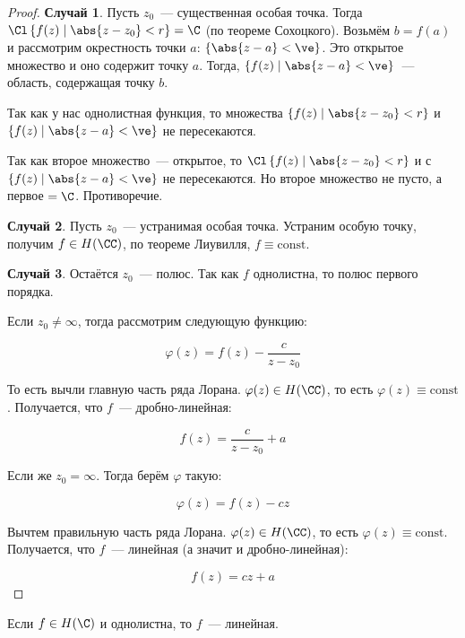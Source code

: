 \begin{proof}\text{}

    \textbf{Случай 1}. Пусть $z_0$~--- существенная особая точка.
    Тогда $\Cl\left\{ f(z) \mid \abs{z-z_0} < r \right\} = \C$
    (по теореме Сохоцкого). Возьмём $b = f(a)$ и рассмотрим окрестность
    точки $a$: $\left\{ \abs{z-a} < \ve \right\}$.
    Это открытое множество и оно содержит точку $a$.
    Тогда, $\left\{ f(z) \mid \abs{z-a} < \ve \right\}$~--- область,
    содержащая точку $b$.

    Так как у нас однолистная функция, то
    множества $\left\{ f(z) \mid \abs{z-z_0} < r \right\}$ и
    $\left\{ f(z) \mid \abs{z-a} < \ve \right\}$ не пересекаются.

    Так как второе множество~--- открытое,
    то $\Cl\left\{ f(z) \mid \abs{z-z_0} < r \right\}$ и
    с $\left\{ f(z) \mid \abs{z-a} < \ve \right\}$ не пересекаются.
    Но второе множество не пусто, а первое $ = \C$. Противоречие.

    \textbf{Случай 2}. Пусть $z_0$~--- устранимая особая точка.
    Устраним особую точку, получим $f \in H(\CC)$, по теореме Лиувилля,
    $f \equiv \mathrm{const}$.

    \textbf{Случай 3}. Остаётся $z_0$~--- полюс.
    Так как $f$ однолистна, то полюс первого порядка.

    Если $z_0 \ne \infty$, тогда рассмотрим следующую функцию:

    \[
        \varphi(z) = f(z) - \frac{c}{z-z_0}
    \]

    То есть вычли главную часть ряда Лорана.
    $\varphi(z) \in H(\CC)$, то есть $\varphi(z) \equiv \mathrm{const}$.
    Получается, что $f$~--- дробно-линейная:

    \[
        f(z) = \frac{c}{z-z_0} + a
    \]

    Если же $z_0 = \infty$.
    Тогда берём $\varphi$ такую:

    \[
        \varphi(z) = f(z) - cz
    \]

    Вычтем правильную часть ряда Лорана.
    $\varphi(z) \in H(\CC)$, то есть $\varphi(z) \equiv \mathrm{const}$.
    Получается, что $f$~--- линейная (а значит и дробно-линейная):

    \[
        f(z) = cz + a
    \]
\end{proof}

\begin{consequence}
    Если $f \in H(\C)$ и однолистна, то $f$~--- линейная.
\end{consequence}
